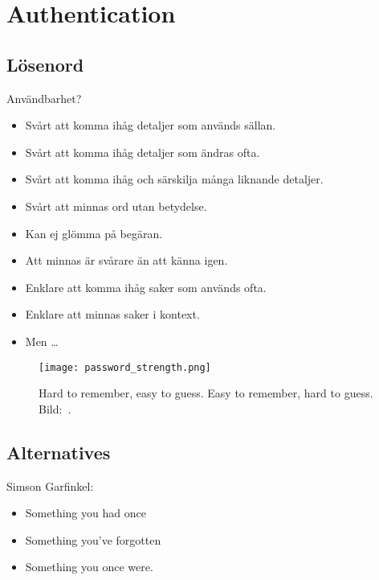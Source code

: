 \documentclass{beamer}
\begin{document}
\section{Authentication}

\subsection{Lösenord}

\begin{frame}{Användbarhet?}
  \begin{itemize}
    \item Svårt att komma ihåg detaljer som används sällan.
    \item Svårt att komma ihåg detaljer som ändras ofta.
    \item Svårt att komma ihåg och särskilja många liknande detaljer.
    \item Svårt att minnas ord utan betydelse.
    \item Kan ej glömma på begäran.
    \item Att minnas är svårare än att känna igen.
  \end{itemize}
\end{frame}

\begin{frame}
  \begin{itemize}
    \item Enklare att komma ihåg saker som används ofta.
    \item Enklare att minnas saker i kontext.
    \item Men \dots
  \end{itemize}
\end{frame}

\begin{frame}
  \begin{figure}
    \texttt{[image: password\_strength.png]}
    \caption{%
      Hard to remember, easy to guess.
      Easy to remember, hard to guess.
      Bild:~\cite{xkcd936}.
    }
  \end{figure}
\end{frame}

\subsection{Alternatives}

\begin{frame}
  \begin{block}{Simson Garfinkel:}
    \begin{itemize}
      \item Something you had once
      \item Something you've forgotten
      \item Something you once were.
    \end{itemize}
  \end{block}
\end{frame}
\end{document}
